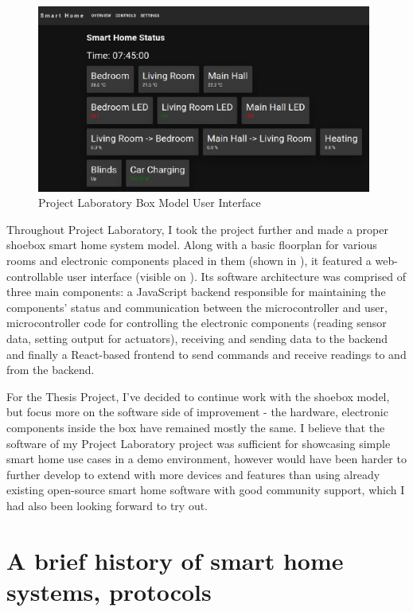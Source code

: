 \begin{figure}[!ht]
    \centering
    \includegraphics[width=110mm, keepaspectratio]{figures/proj_lab_ui.png}
    \caption{Project Laboratory Box Model User Interface}
    \label{fig:ProjLabUI}
\end{figure}

Throughout Project Laboratory, I took the project further and made a proper shoebox smart home system model. Along with a basic floorplan for various rooms and electronic components placed in them (shown in ), it featured a web-controllable user interface (visible on ). Its software architecture was comprised of three main components: a JavaScript backend responsible for maintaining the components' status and communication between the microcontroller and user, microcontroller code for controlling the electronic components (reading sensor data, setting output for actuators), receiving and sending data to the backend and finally a React-based frontend to send commands and receive readings to and from the backend.

For the Thesis Project, I've decided to continue work with the shoebox model, but focus more on the software side of improvement - the hardware, electronic components inside the box have remained mostly the same. I believe that the software of my Project Laboratory project was sufficient for showcasing simple smart home use cases in a demo environment, however would have been harder to further develop to extend with more devices and features than using already existing open-source smart home software with good community support, which I had also been looking forward to try out.

\section{A brief history of smart home systems, protocols}

